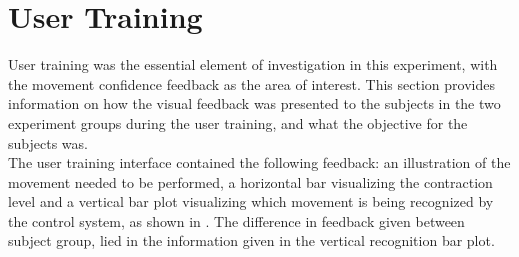 
\section{User Training} \label{sec:M:usertraining}
User training was the essential element of investigation in this experiment, with the movement confidence feedback as the area of interest. This section provides information on how the visual feedback was presented to the subjects in the two experiment groups during the user training, and what the objective for the subjects was. \\
The user training interface contained the following feedback: an illustration of the movement needed to be performed, a horizontal bar visualizing the contraction level and a vertical bar plot visualizing which movement is being recognized by the control system, as shown in . The difference in feedback given between subject group, lied in the information given in the vertical recognition bar plot.

